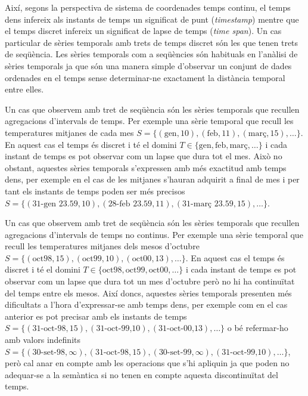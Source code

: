 Així, segons la perspectiva de sistema de coordenades temps continu,
el temps dens infereix als instants de temps un significat de punt
(\emph{timestamp}) mentre que el temps discret infereix un significat
de lapse de temps (\emph{time span}).  
Un cas particular de sèries temporals amb trets de temps
discret són les que tenen trets de seqüència. Les sèries temporals com
a seqüències són habituals en l'anàlisi de sèries temporals ja que són
una manera simple d'observar un conjunt de dades ordenades en el temps
sense determinar-ne exactament la distància temporal entre elles.


Un cas que observem amb tret de seqüència són les sèries temporals que
recullen agregacions d'intervals de temps. Per exemple una sèrie
temporal que recull les temperatures mitjanes de cada mes
$S=\{(\text{gen},10),(\text{feb},11),(\text{març},15),\dotsc\}$. En
aquest cas el temps és discret i té el domini
$T\in\{\text{gen},\text{feb},\text{març},\dotsc\}$ i cada instant de
temps es pot observar com un lapse que dura tot el mes. Això no
obstant, aquestes sèries temporals s'expressen amb més exactitud amb
temps dens, per exemple en el cas de les mitjanes s'hauran adquirit a
final de mes i per tant els instants de temps poden ser més precisos
$S=\{(\text{31-gen 23.59},10),(\text{28-feb 23.59},11),(\text{31-març
  23.59},15),\dotsc\}$.

Un cas que observem amb tret de seqüència són les sèries temporals que
recullen agregacions d'intervals de temps no continus.  Per exemple
una sèrie temporal que recull les temperatures mitjanes dels mesos
d'octubre
$S=\{(\text{oct98},15),(\text{oct99},10),(\text{oct00},13),\dotsc\}$.
En aquest cas el temps és discret i té el domini
$T\in\{\text{oct98},\text{oct99},\text{oct00},\dotsc\}$ i cada instant
de temps es pot observar com un lapse que dura tot un mes d'octubre
però no hi ha continuïtat del temps entre els mesos. Així doncs,
aquestes sèries temporals presenten més dificultats a l'hora
d'expressar-se amb temps dens, per exemple com en el cas anterior es
pot precisar amb els instants de temps
$S=\{(\text{31-oct-98},15),(\text{31-oct-99,10}),(\text{31-oct-00,13}),\dotsc\}$
o bé refermar-ho amb valors indefinits
$S=\{(\text{30-set-98},\infty),(\text{31-oct-98},15),(\text{30-set-99},\infty),(\text{31-oct-99,10}),\dotsc\}$,
però cal anar en compte amb les operacions que s'hi apliquin ja que
poden no adequar-se a la semàntica si no tenen en compte aquesta
discontinuïtat del temps. 



